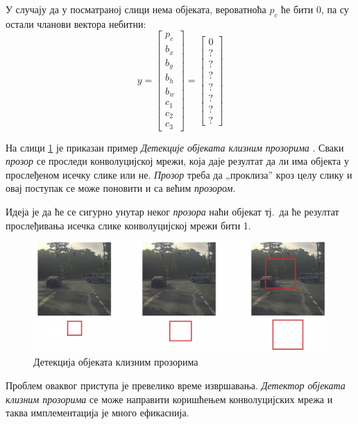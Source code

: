 \documentclass[12pt, а4paper]{article}
\begin{document}
У случају да у посматраној слици нема објеката, вероватноћа $p_c$ ће бити
0, па су остали чланови вектора небитни:
\begin{equation}
y =
\begin{bmatrix}
 p_c \\
 b_x \\
 b_y \\
 b_h \\
 b_w \\
 c_1 \\
 c_2 \\
 c_3
\end{bmatrix}
=
\begin{bmatrix}
 0 \\
 ? \\
 ? \\
 ? \\
 ? \\
 ? \\
 ? \\
 ?
\end{bmatrix}
\label{eq:detNoResKl}
\end{equation}

На слици \ref{fig:ng_slidW} је приказан пример
\textit{Детекције објеката клизним прозорима} \cite{ngObjDet}.
Сваки \textit{прозор} се проследи конволуцијској мрежи, која
даје резултат да ли има објекта у прослеђеном исечку слике
или не. \textit{Прозор} треба да „проклиза” кроз целу слику
и овај поступак се може поновити и са већим
\textit{прозором}.

Идеја је да ће се сигурно унутар неког \textit{прозора}
наћи објекат тј.\ да ће резултат прослеђивања исечка слике
конволуцијској мрежи бити 1.

\begin{figure}[H]
  \centering
      \includegraphics[scale=0.3]{slike/slidW.png}
  \caption{Детекција објеката клизним прозорима}
  \label{fig:ng_slidW}
\end{figure}

Проблем оваквог приступа је превелико време извршавања.
\textit{Детектор објеката клизним прозорима} се може
направити коришћењем конволуцијских мрежа и таква
имплементација је много ефикаснија.
\end{document}
